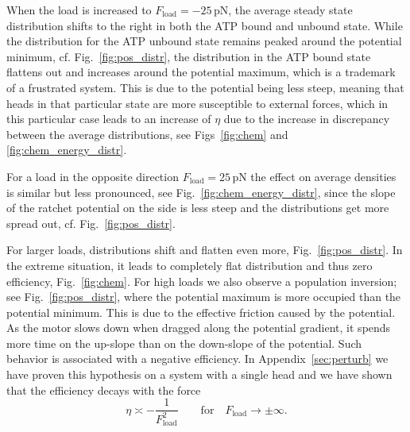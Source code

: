 \documentclass[aps,pre,twocolumn,showpacs,showkeys,superscriptaddress,floatfix]{revtex4-1}
\begin{document}
When the load is increased to $F_\text{load} = - 25 \, \mathrm{pN}$, the average steady state distribution shifts to the right in both the ATP bound and unbound state. 
While the distribution for the ATP unbound state remains peaked around the potential minimum, cf. Fig.~\ref{fig:pos_distr},
the distribution in the ATP bound state flattens out and increases around the potential maximum,
which is a trademark of a frustrated system.  
This is due to the potential being less steep, meaning that heads in that particular state are more susceptible to external forces,  
which in this particular case leads to an increase of $\eta$ due to the increase in discrepancy between the average distributions, 
see Figs~\ref{fig:chem} and \ref{fig:chem_energy_distr}. 

For a load in the opposite direction $F_\text{load}= 25 \, \mathrm{pN}$ the effect on average densities is similar but less pronounced, 
see Fig.~\ref{fig:chem_energy_distr}, 
since the slope of the ratchet potential on the side is less steep and the distributions get more spread out, cf. Fig.~\ref{fig:pos_distr}. 

For larger loads, distributions shift and flatten even more, Fig.~\ref{fig:pos_distr}. 
In the extreme situation, it leads to completely flat distribution and thus zero efficiency, Fig.~\ref{fig:chem}.
For high loads we also observe a population inversion; see Fig.~\ref{fig:pos_distr}, 
where the potential maximum is more occupied than the potential minimum. 
This is due to the effective friction caused by the potential. 
As the motor slows down when dragged along the potential gradient, 
 it spends more time on the up-slope than on the down-slope of the potential.
Such behavior is associated with a negative efficiency. 
In Appendix~\ref{sec:perturb} we have proven this hypothesis on a system with a single head and we have shown that the efficiency decays with the force 
\[
\eta \asymp - \frac{1}{ F_\text{load}^2 } \qquad \text{for} \quad F_\text{load} \to \pm \infty .
\]
\end{document}
